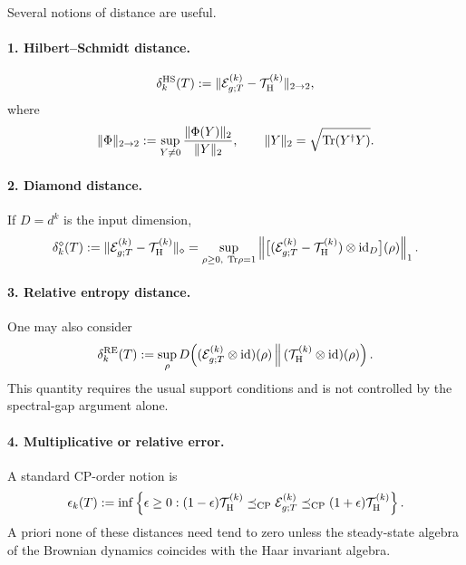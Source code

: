 \documentclass{article}
\theoremstyle{definition}
\begin{document}
Several notions of distance are useful.

\paragraph{1. Hilbert--Schmidt distance.}
\begin{equation}
    \delta_k^{\rm HS}(T)
    :=\|{\cal E}_{g;T}^{(k)}-{\cal T}_{\rm H}^{(k)}\|_{2\to2},
\end{equation}
where
\begin{equation}
    \|\Phi\|_{2\to2}
    :=\sup_{Y\neq0}\frac{\|\Phi(Y)\|_2}{\|Y\|_2},
    \qquad
    \|Y\|_2=\sqrt{{\rm Tr}(Y^\dagger Y)}.
\end{equation}

\paragraph{2. Diamond distance.}
If $D=d^k$ is the input dimension,
\begin{equation}
    \delta_k^\diamond(T)
    :=\|{\cal E}_{g;T}^{(k)}-{\cal T}_{\rm H}^{(k)}\|_\diamond
    =\sup_{\rho\ge0,\ {\rm Tr}\rho=1}
      \left\|
       \bigl[({\cal E}_{g;T}^{(k)}-{\cal T}_{\rm H}^{(k)})
       \otimes{\rm id}_{D}\bigr](\rho)
      \right\|_1.
\end{equation}

\paragraph{3. Relative entropy distance.}
One may also consider
\begin{equation}
    \delta_k^{\rm RE}(T)
    :=\sup_\rho
      D\!\left(
        ({\cal E}_{g;T}^{(k)}\otimes{\rm id})(\rho)
        \,\middle\|\,
        ({\cal T}_{\rm H}^{(k)}\otimes{\rm id})(\rho)
      \right).
\end{equation}
This quantity requires the usual support conditions and is not controlled
by the spectral-gap argument alone.

\paragraph{4. Multiplicative or relative error.}
A standard CP-order notion is
\begin{equation}
    \epsilon_k(T)
    :=\inf\left\{
      \epsilon\ge0:
      (1-\epsilon){\cal T}_{\rm H}^{(k)}
      \preceq_{\rm CP}{\cal E}_{g;T}^{(k)}
      \preceq_{\rm CP}
      (1+\epsilon){\cal T}_{\rm H}^{(k)}
    \right\}.
\end{equation}
A priori none of these distances need tend to zero unless the steady-state
algebra of the Brownian dynamics coincides with the Haar invariant algebra.
\end{document}
